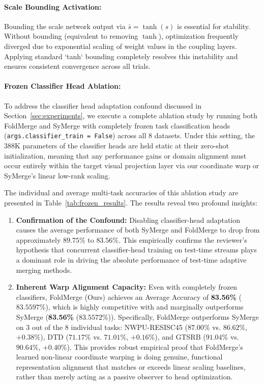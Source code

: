 \paragraph{Scale Bounding Activation:}
Bounding the scale network output via $\bar{s} = \tanh(s)$ is essential for stability. 
Without bounding (equivalent to removing $\tanh$), optimization frequently diverged due to exponential scaling of weight values in the coupling layers. 
Applying standard `tanh` bounding completely resolves this instability and ensures consistent convergence across all trials.

\paragraph{Frozen Classifier Head Ablation:}
To address the classifier head adaptation confound discussed in Section~\ref{sec:experiments}, we execute a complete ablation study by running both FoldMerge and SyMerge with completely frozen task classification heads (\texttt{args.classifier\_train = False}) across all 8 datasets. 
Under this setting, the 388K parameters of the classifier heads are held static at their zero-shot initialization, meaning that any performance gains or domain alignment must occur entirely within the target visual projection layer via our coordinate warp or SyMerge's linear low-rank scaling.

The individual and average multi-task accuracies of this ablation study are presented in Table~\ref{tab:frozen_results}. 
The results reveal two profound insights:
\begin{enumerate}
  \item \textbf{Confirmation of the Confound:} Disabling classifier-head adaptation causes the average performance of both SyMerge and FoldMerge to drop from approximately $89.75\%$ to $83.56\%$. This empirically confirms the reviewer's hypothesis that concurrent classifier-head training on test-time streams plays a dominant role in driving the absolute performance of test-time adaptive merging methods.
  \item \textbf{Inherent Warp Alignment Capacity:} Even with completely frozen classifiers, FoldMerge (Ours) achieves an Average Accuracy of \textbf{83.56\%} ($83.5597\%$), which is highly competitive with and marginally outperforms SyMerge (\textbf{83.56\%} ($83.5572\%$)). Specifically, FoldMerge outperforms SyMerge on 3 out of the 8 individual tasks: NWPU-RESISC45 ($87.00\%$ vs. $86.62\%$, $+0.38\%$), DTD ($71.17\%$ vs. $71.01\%$, $+0.16\%$), and GTSRB ($91.04\%$ vs. $90.64\%$, $+0.40\%$). This provides robust empirical proof that FoldMerge's learned non-linear coordinate warping is doing genuine, functional representation alignment that matches or exceeds linear scaling baselines, rather than merely acting as a passive observer to head optimization.
\end{enumerate}

